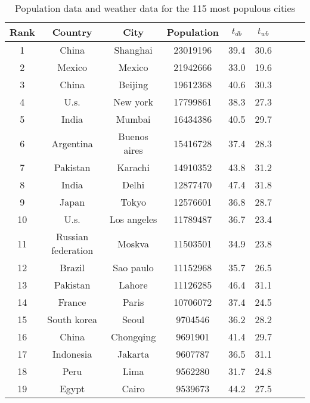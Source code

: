 \begin{table}
\centering
\caption{Population data and weather data for the 115 most populous cities}
\label{tab:pop_weather}
\begin{tabular}{ccccccccc}
\toprule
Rank &             Country &            City & Population & $t_{db}$ & $t_{wb}$ \\
\midrule
   1 &               China &        Shanghai &   23019196 &     39.4 &     30.6 \\
   2 &              Mexico &          Mexico &   21942666 &     33.0 &     19.6 \\
   3 &               China &         Beijing &   19612368 &     40.6 &     30.3 \\
   4 &                U.s. &        New york &   17799861 &     38.3 &     27.3 \\
   5 &               India &          Mumbai &   16434386 &     40.5 &     29.7 \\
   6 &           Argentina &    Buenos aires &   15416728 &     37.4 &     28.3 \\
   7 &            Pakistan &         Karachi &   14910352 &     43.8 &     31.2 \\
   8 &               India &           Delhi &   12877470 &     47.4 &     31.8 \\
   9 &               Japan &           Tokyo &   12576601 &     36.8 &     28.7 \\
  10 &                U.s. &     Los angeles &   11789487 &     36.7 &     23.4 \\
  11 &  Russian federation &          Moskva &   11503501 &     34.9 &     23.8 \\
  12 &              Brazil &       Sao paulo &   11152968 &     35.7 &     26.5 \\
  13 &            Pakistan &          Lahore &   11126285 &     46.4 &     31.1 \\
  14 &              France &           Paris &   10706072 &     37.4 &     24.5 \\
  15 &         South korea &           Seoul &    9704546 &     36.2 &     28.2 \\
  16 &               China &       Chongqing &    9691901 &     41.4 &     29.7 \\
  17 &           Indonesia &         Jakarta &    9607787 &     36.5 &     31.1 \\
  18 &                Peru &            Lima &    9562280 &     31.7 &     24.8 \\
  19 &               Egypt &           Cairo &    9539673 &     44.2 &     27.5 \\

\end{tabular}
\end{table}
